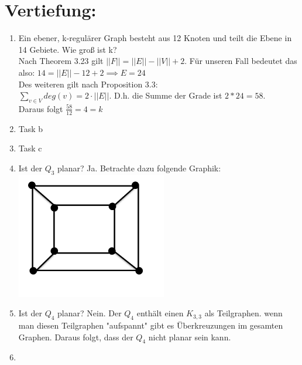 



    \maketitle
    \section*{Vertiefung:}
    \begin{enumerate}[label=(\alph*)]
        \item  Ein ebener,
        k-regulärer Graph besteht aus
        12 Knoten und teilt die Ebene in
        14 Gebiete. Wie groß ist k? \\
        Nach Theorem 3.23 gilt $||F|| = ||E|| - ||V|| + 2$. Für unseren Fall bedeutet das also:
        $14 = ||E|| - 12 + 2 \implies E = 24$ \\
        Des weiteren gilt nach Proposition 3.3: \\
        $\sum_{v \in V} deg(v) = 2 \cdot ||E||$. D.h. die Summe der Grade ist $2 * 24 = 58$. \\
        Daraus folgt $\frac{58}{12} = 4 = k$
        
        \item Task b
        
        
        \item Task c
        
        \item Ist der $Q_3$ planar? 
        Ja. Betrachte dazu folgende Graphik:\\
        \includegraphics{Q3}
        
        \item Ist der $Q_4$ planar?
        Nein. Der $Q_4$ enthält einen $K_{3,3}$ als Teilgraphen. wenn man diesen Teilgraphen "aufspannt" gibt es Überkreuzungen im gesamten Graphen. Daraus folgt, dass der $Q_4$ nicht planar sein kann.
        \item
        

\end{enumerate}
